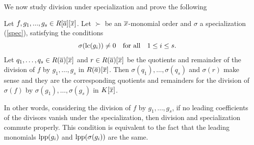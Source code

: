 We now study division under specialization and prove the following

\begin{prop} \label{propdiv}
 Let $f, g_1,...,g_s \in R[\overline{a}][\overline{x}]$.
 Let $\succ$ be an $\overline{x}$-monomial order and $\sigma$ a specialization
 (\ref{spec}), satisfying the conditions
 \[\sigma(\hbox{\rm lc}(g_i)) \ne 0 \ \ \hbox{ for all } \ \ 1 \le i \le
  s .\]
 Let $q_1, \dots,q_s \in R(\overline{a})[\overline{x}]$ and $r \in R(\overline{a})[\overline{x}]$ be
 the quotients and remainder of the division of $f$ by $g_1,\dots,g_s$
 in $R(\overline{a})[\overline{x}]$. Then $\sigma(q_1),\dots,\sigma(q_s)$ and $\sigma(r)$
 make sense and they are the corresponding quotients and remainders for the division
 of $\sigma(f)$ by $\sigma(g_1), \dots, \sigma(g_s)$ in $K[\overline{x}]$.

\end{prop}

 In other words, considering the division of $f$
 by $g_1,...,g_s$, if no leading coefficients of the divisors
 vanish under the specialization, then division and specialization commute properly.
 This condition is equivalent to the fact that the leading monomials $\hbox{\rm lpp}(g_i)$
 and $\hbox{\rm lpp}(\sigma(g_i))$ are the same.

